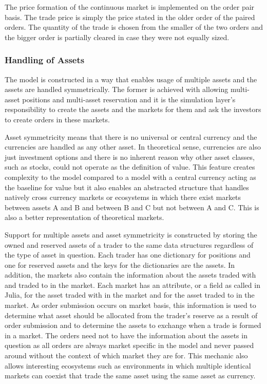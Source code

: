 The price formation of the continuous market is implemented
on the order pair basis. The trade price is simply the price
stated in the older order of the paired orders. %
The quantity of the trade is chosen from the smaller of the two orders
and the bigger order is partially cleared in case they were not 
equally sized.



\subsubsection{Handling of Assets}

The model is constructed in a way that enables usage of multiple assets
and the assets are handled symmetrically. The former is achieved with
allowing multi-asset positions and multi-asset reservation and 
it is the simulation layer's responsibility to create the assets and the 
markets for them and ask the investors to create orders in these markets. 

Asset symmetricity means that there is no universal or central currency 
and the currencies are handled as any other asset. In theoretical sense, 
currencies are also just investment options and there is no inherent reason why other 
asset classes, such as stocks, could not operate as the definition 
of value. This feature creates complexity to the model compared to a model
with a central currency acting as the baseline for value but it also enables an
abstracted structure that handles natively cross currency
markets or ecosystems in which there exist markets between assets A and 
B and between B and C but not between A and C. This is also a better 
representation of theoretical markets.

Support for multiple assets and asset symmetricity is constructed by storing 
the owned and reserved assets of a trader to the same data structures regardless
of the type of asset in question. Each trader has one dictionary for positions 
and one for reserved assets and the keys for the dictionaries are the assets. 
In addition, the markets also contain the information about the assets traded with and traded to 
in the market. Each market has an attribute, or a field as called
in Julia, for the asset traded with in the market and for the asset
traded to in the market. As order submission occurs on market basis, this information
is used to determine what asset should be allocated from the trader's reserve as a result of 
order submission and to determine the assets to exchange when a trade is formed in a market. 
The orders need not to have the information about the assets in question as all orders are always
market specific in the model and never passed around without the context of which market they are 
for. This mechanic also allows interesting ecosystems such as environments
in which multiple identical markets can coexist that trade the same asset using the same asset as
currency. 

